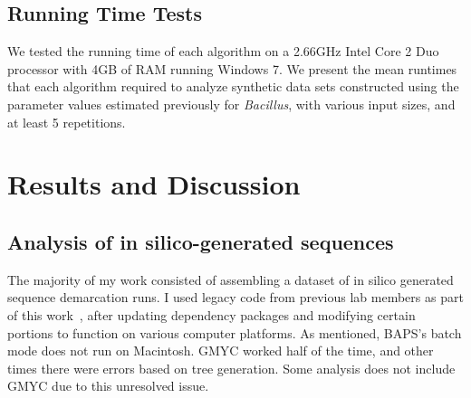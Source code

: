 \subsection*{Running Time Tests}
We tested the running time of each algorithm on a 2.66GHz Intel Core 2 Duo processor with 4GB of RAM running Windows 7.
We present the mean runtimes that each algorithm required to analyze synthetic data sets constructed using the parameter values estimated previously for \emph{Bacillus}, with various input sizes, and at least 5 repetitions.

\section{Results and Discussion}


\subsection*{Analysis of in silico-generated sequences}
The majority of my work consisted of assembling a dataset of in silico generated sequence demarcation runs.
I used legacy code from previous lab members as part of this work~\cite{carlo}, after updating dependency packages and modifying certain portions to function on various computer platforms.
As mentioned, BAPS's batch mode does not run on Macintosh.
GMYC worked half of the time, and other times there were errors based on tree generation.
Some analysis does not include GMYC due to this unresolved issue.

